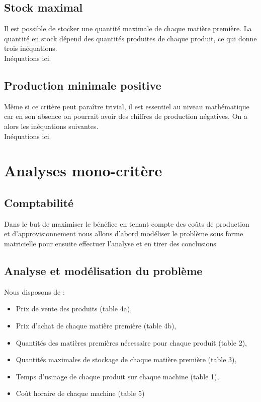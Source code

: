 \documentclass{article}
\begin{document}
\subsection{Stock maximal}
Il est possible de stocker une quantité maximale de chaque matière première. La quantité en stock dépend des quantités produites de chaque produit, ce qui donne trois inéquations.\\

Inéquations ici.

\subsection{Production minimale positive}
Même si ce critère peut paraître trivial, il est essentiel au niveau mathématique car en son absence on pourrait avoir des chiffres de production négatives. On a alors les inéquations suivantes.\\

Inéquations ici.


\section{Analyses mono-critère}
\subsection{Comptabilité}

Dans le but de maximiser le bénéfice en tenant compte des coûts de production et d’approvisionnement nous allons d'abord modéliser le problème sous forme matricielle pour ensuite effectuer l'analyse et en tirer des conclusions \\

\subsection{Analyse et modélisation du problème}
Nous disposons de : \\

\begin{itemize}
\item Prix de vente des produits (table 4a),
\item Prix d’achat de chaque matière première (table 4b),
\item Quantités des matières premières nécessaire pour chaque produit (table 2),
\item Quantités maximales de stockage de chaque matière première (table 3),
\item Temps d’usinage de chaque produit sur chaque machine (table 1),
\item Coût horaire de chaque machine (table 5)
\end{itemize}
\end{document}

